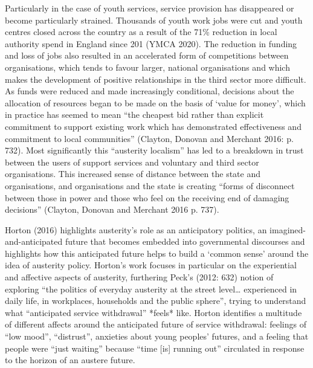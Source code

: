 Particularly in the case of youth services, service provision has
disappeared or become particularly strained. Thousands of youth work
jobs were cut and youth centres closed across the country as a result of
the 71\% reduction in local authority spend in England since 201 (YMCA
2020). The reduction in funding and loss of jobs also resulted in an
accelerated form of competitions between organisations, which tends to
favour larger, national organisations and which makes the development of
positive relationships in the third sector more difficult. As funds were
reduced and made increasingly conditional, decisions about the
allocation of resources began to be made on the basis of `value for
money', which in practice has seemed to mean ``the cheapest bid rather
than explicit commitment to support existing work which has demonstrated
effectiveness and commitment to local communities'' (Clayton, Donovan
and Merchant 2016: p. 732). Most significantly this ``austerity
localism'' has led to a breakdown in trust between the users of support
services and voluntary and third sector organisations. This increased
sense of distance between the state and organisations, and organisations
and the state is creating ``forms of disconnect between those in power
and those who feel on the receiving end of damaging decisions''
(Clayton, Donovan and Merchant 2016 p. 737).

Horton (2016) highlights austerity's role as an anticipatory politics,
an imagined-and-anticipated future that becomes embedded into
governmental discourses and highlights how this anticipated future helps
to build a `common sense' around the idea of austerity policy. Horton's
work focuses in particular on the experiential and affective aspects of
austerity, furthering Peck's (2012: 632) notion of exploring ``the
politics of everyday austerity at the street level\ldots{} experienced
in daily life, in workplaces, households and the public sphere'', trying
to understand what ``anticipated service withdrawal'' *feels* like.
Horton identifies a multitude of different affects around the
anticipated future of service withdrawal: feelings of ``low mood'',
``distrust'', anxieties about young peoples' futures, and a feeling that
people were ``just waiting'' because ``time {[}is{]} running out''
circulated in response to the horizon of an austere future.

